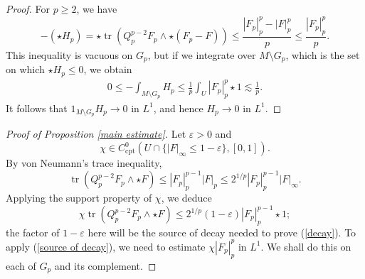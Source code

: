 \documentclass[reqno,11pt]{amsart}
\DeclareMathOperator{\tr}{tr}
\newcommand{\cpt}{\mathrm{cpt}}
\theoremstyle{definition}
\numberwithin{equation}{section}
\begin{document}
\begin{proof}
For $p \geq 2$, we have \cite[Proposition 2.3]{daskalopoulos2022analytic}
$$-(\star H_p) = \star \tr(Q_p^{p - 2} F_p \wedge \star (F_p - F)) \leq \frac{|F_p|_p^p - |F|_p^p}{p} \leq \frac{|F_p|_p^p}{p}.$$
This inequality is vacuous on $G_p$, but if we integrate over $M \setminus G_p$, which is the set on which $\star H_p \leq 0$, we obtain
\begin{align*}
0 \leq -\int_{M \setminus G_p} H_p \leq \frac{1}{p} \int_U |F_p|_p^p \star 1 \lesssim \frac{1}{p}.
\end{align*}
It follows that $1_{M \setminus G_p} H_p \to 0$ in $L^1$, and hence $H_p \to 0$ in $L^1$.
\end{proof}

\begin{proof}[Proof of Proposition \ref{main estimate}]
Let $\varepsilon > 0$ and
$$\chi \in C^0_\cpt(U \cap \{|F|_\infty \leq 1 - \varepsilon\}, [0, 1]).$$
By von Neumann's trace inequality, 
$$\tr(Q_p^{p - 2} F_p \wedge \star F) \leq |F_p|_p^{p - 1} |F|_p \leq 2^{1/p} |F_p|_p^{p - 1} |F|_\infty.$$
Applying the support property of $\chi$, we deduce
\begin{equation}\label{source of decay}
\chi \tr(Q_p^{p - 2} F_p \wedge \star F) \leq 2^{1/p} (1 - \varepsilon) |F_p|_p^{p - 1} \star 1;
\end{equation}
the factor of $1 - \varepsilon$ here will be the source of decay needed to prove (\ref{decay}).
To apply (\ref{source of decay}), we need to estimate $\chi |F_p|_p^p$ in $L^1$.
We shall do this on each of $G_p$ and its complement.


\end{proof}
\end{document}
